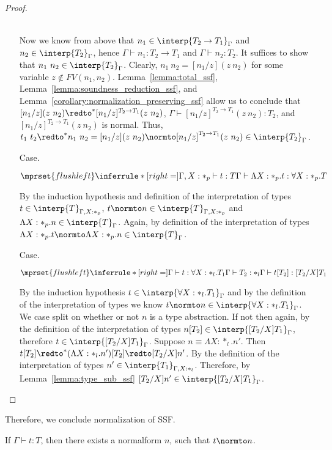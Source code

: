 \begin{proof}
\begin{itemize}
  \ \\
  Now we know from above that $n_1 \in \interp{T_2 \rightarrow T_1}_\Gamma$ and
  $n_2 \in \interp{T_2}_\Gamma$, hence $\Gamma \vdash n_1:T_2 \to T_1$ and
  $\Gamma \vdash n_2:T_2$.  It suffices to show that $n_1\ n_2 \in \interp{T_2}_\Gamma$.
  Clearly, $n_1\ n_2 = [n_1/z](z\ n_2)$ for some variable $z \not \in FV(n_1,n_2)$.  
  Lemma~\ref{lemma:total_ssf}, Lemma~\ref{lemma:soundness_reduction_ssf}, 
  and Lemma~\ref{corollary:normalization_preserving_ssf} allow us to conclude that 
  $[n_1/z](z\ n_2) \redto^* [n_1/z]^{T_2 \to T_1}(z\ n_2)$, $\Gamma \vdash [n_1/z]^{T_2 \to T_1}(z\ n_2):T_2$,
  and $[n_1/z]^{T_2 \to T_1}(z\ n_2)$ is normal.  Thus, 
  $t_1\ t_2 \redto^* n_1\ n_2 = [n_1/z](z\ n_2) \normto [n_1/z]^{T_2 \to T_1}(z\ n_2) \in \interp{T_2}_\Gamma$.
  
\item[Case.]\ \\
  \begin{center}
    \begin{math}
      $$\mprset{flushleft}
      \inferrule* [right=] {
        \Gamma, X : *_p \vdash t : T
      }{\Gamma \vdash \Lambda X:*_p.t:\forall X:*_p.T}
    \end{math}
  \end{center}
  By the induction hypothesis and definition of the interpretation of types 
  $t \in \interp{T}_{\Gamma,X:*_p}$, $t \normto n \in \interp{T}_{\Gamma,X:*_p}$ and 
  $\Lambda X:*_p.n \in \interp{T}_{\Gamma}$.  Again, by definition of the interpretation 
  of types $\Lambda X:*_p.t \normto \Lambda X:*_p.n \in \interp{T}_{\Gamma}$.

\item[Case.]\ \\
  \begin{center}
    \begin{math}
      $$\mprset{flushleft}
      \inferrule* [right=] {
        \Gamma \vdash t:\forall X:*_l.T_1
        \\
        \Gamma \vdash T_2:*_l
      }{\Gamma \vdash t[T_2]: [T_2/X]T_1}
    \end{math}
  \end{center}
  By the induction hypothesis $t \in \interp{\forall X:*_l.T_1}_\Gamma$ and by the 
  definition of the interpretation of types we know 
  $t \normto n \in \interp{\forall X:*_l.T_1}_\Gamma$.  We case
  split on whether or not $n$ is a type abstraction. If not then again, by the 
  definition of the interpretation of types 
  $n[T_2] \in \interp{[T_2/X]T_1}_\Gamma$, therefore 
  $t \in \interp{[T_2/X]T_1}_\Gamma$.  Suppose $n \equiv \Lambda X:*_l.n'$.  Then 
  $t[T_2] \redto^* (\Lambda X:*_l.n')[T_2] \redto [T_2/X]n'$.  By the definition 
  of the interpretation of types $n' \in \interp{T_1}_{\Gamma,X:*_l}$. Therefore, by
  Lemma~\ref{lemma:type_sub_ssf} $[T_2/X]n' \in \interp{[T_2/X]T_1}_{\Gamma}$.
\end{itemize}
\end{proof}
\noindent Therefore, we conclude normalization of SSF.
\begin{corollary}[Normalization]
  If $\Gamma \vdash t:T$, then there exists a normalform $n$, such
  that $t \normto n$.
\end{corollary}

